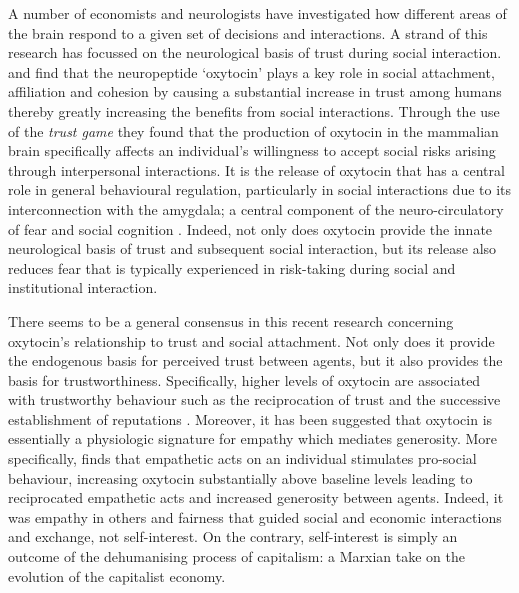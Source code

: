 \begin{subappendices}
A number of economists and neurologists have investigated how different areas of the brain respond to a given set of decisions and interactions. A strand of this research has focussed on the neurological basis of trust during social interaction. \citet{Zak2004} and \citet{Kosfeld2005} find that the neuropeptide `oxytocin' plays a key role in social attachment, affiliation and cohesion by causing a substantial increase in trust among humans thereby greatly increasing the benefits from social interactions. Through the use of the \emph{trust game} they found that the production of oxytocin in the mammalian brain specifically affects an individual's willingness to accept social risks arising through interpersonal interactions. It is the release of oxytocin that has a central role in general behavioural regulation, particularly in social interactions due to its interconnection with the amygdala; a central component of the neuro-circulatory of fear and social cognition \citep{Kirsch2005}. Indeed, not only does oxytocin provide the innate neurological basis of trust and subsequent social interaction, but its release also reduces fear that is typically experienced in risk-taking during social and institutional interaction.

There seems to be a general consensus in this recent research concerning oxytocin's relationship to trust and social attachment. Not only does it provide the endogenous basis for perceived trust between agents, but it also provides the basis for trustworthiness. Specifically, higher levels of oxytocin are associated with trustworthy behaviour such as the reciprocation of trust and the successive establishment of reputations \citep{Zak2005}.  Moreover, it has been suggested that oxytocin is essentially a physiologic signature for empathy which mediates generosity. More specifically, \citet{Barraza2009} finds that empathetic acts on an individual stimulates pro-social behaviour, increasing oxytocin substantially above baseline levels leading to reciprocated empathetic acts and increased generosity between agents. Indeed, it was empathy in others and fairness that guided social and economic interactions and exchange, not self-interest. On the contrary, self-interest is simply an outcome of the dehumanising process of capitalism: a Marxian take on the evolution of the capitalist economy.


\end{subappendices}
